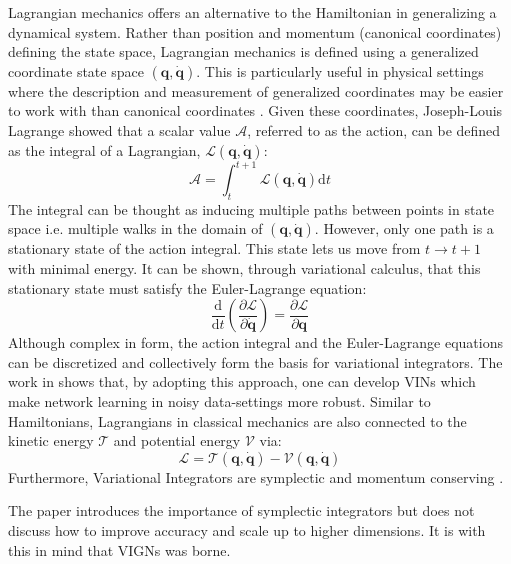 \documentclass{article}
\begin{document}
Lagrangian mechanics offers an alternative to the Hamiltonian in generalizing a dynamical system. Rather than position and momentum (canonical coordinates) defining the state space, Lagrangian mechanics is defined using a generalized coordinate state space $(\mathbf{q},\dot{\mathbf{q}})$. This is particularly useful in physical settings where the description and measurement of generalized coordinates may be easier to work with than canonical coordinates \cite{marsden_discrete_2001}. Given these coordinates, Joseph-Louis Lagrange showed that a scalar value $\mathcal{A}$, referred to as the action, can be defined as the integral of a Lagrangian, $\mathcal{L}(\mathbf{q},\dot{\mathbf{q}})$:
\begin{equation}
\mathcal{A} = \int_{t}^{t+1} \mathcal{L}(\mathbf{q},\dot{\mathbf{q}}) \mathrm{d}t
\label{eqn.action_integral}
\end{equation}
The integral can be thought as inducing multiple paths between points in state space i.e. multiple walks in the domain of $(\mathbf{q},\mathbf{\dot{q}})$. However, only one path is a stationary state of the action integral. This state lets us move from $t \rightarrow t+1$ with minimal energy. It can be shown, through variational calculus, that this stationary state must satisfy the Euler-Lagrange equation:
\begin{equation}
\frac{\mathrm{d} }{\mathrm{d}t} \left ( \frac{\partial \mathcal{L}}{\partial \dot{\mathbf{q}}} \right )= \frac{\partial \mathcal{L}}{\partial \mathbf{q}}
\label{eqn.euler_lagrange}
\end{equation}
Although complex in form, the action integral and the Euler-Lagrange equations can be discretized and collectively form the basis for variational integrators. The work in \cite{saemundsson_variational_2019} shows that, by adopting this approach, one can develop VINs which make network learning in noisy data-settings more robust. Similar to Hamiltonians, Lagrangians in classical mechanics are also connected to the kinetic energy $\mathcal{T}$ and potential energy $\mathcal{V}$ via:
\begin{equation}
\mathcal{L} = \mathcal{T}(\mathbf{q},\mathbf{\dot{q}}) - \mathcal{V} (\mathbf{q},\mathbf{\dot{q}})
\end{equation}
Furthermore, Variational Integrators are symplectic and momentum conserving \cite{lew_overview_nodate}.

The paper introduces the importance of symplectic integrators but does not discuss how to improve accuracy and scale up to higher dimensions. It is with this in mind that VIGNs was borne.
\end{document}
